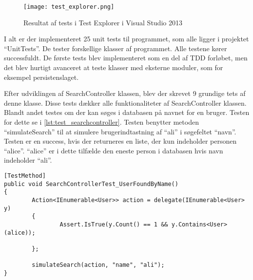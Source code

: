 \begin{figure}
  \centering
  \texttt{[image: test\_explorer.png]}
  \caption{Resultat af tests i Test Explorer i Visual Studio 2013}
  \label{fig:test_explorer}
\end{figure}

I alt er der implementeret 25 unit tests til programmet, som alle ligger i projektet \enquote{UnitTests}. De tester forskellige klasser af programmet. Alle testene kører successfuldt. De første tests blev implementeret som en del af TDD forløbet, men det blev hurtigt avanceret at teste klasser med eksterne moduler, som for eksempel persistenslaget. 

Efter udviklingen af SearchController klassen, blev der skrevet 9 grundige tets af denne klasse. Disse tests dækker alle funktionaliteter af SearchController klassen. Blandt andet testes om der kan søges i databasen på navnet for en bruger. Testen for dette se i \cref{lst:test_searchcontroller}. Testen benytter metoden \enquote{simulateSearch} til at simulere brugerindtastning af \enquote{ali} i søgefeltet \enquote{navn}. Testen er en success, hvis der returneres en liste, der kun indeholder personen \enquote{alice}. \enquote{alice} er i dette tilfælde den eneste person i databasen hvis navn indeholder \enquote{ali}.

\begin{lstlisting}[label=lst:test_searchcontroller, caption={Eksempel på testfunktion}]
[TestMethod]
public void SearchControllerTest_UserFoundByName()
{
        Action<IEnumerable<User>> action = delegate(IEnumerable<User> y)
        {
                Assert.IsTrue(y.Count() == 1 && y.Contains<User>(alice));

        };

        simulateSearch(action, "name", "ali");
}
\end{lstlisting}
